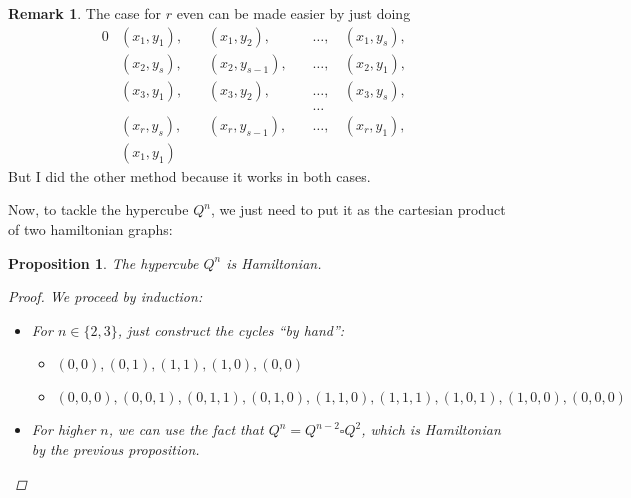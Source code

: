 \documentclass{amsart}
\theoremstyle{plain}
\newtheorem*{proposition}{\textbf{Proposition}}
\theoremstyle{definition}
\newtheorem*{rk}{\textbf{Remark}}
\begin{document}
    \begin{rk}
        The case for $r$ even can be made easier by just doing
        \begin{alignat*}{0}
            & (x_1, y_1),\, && (x_1, y_2),\, && \ldots, \, & (x_1, y_s), & \\
            & (x_2, y_s),\, && (x_2, y_{s-1}),\, && \ldots, \,  & (x_2, y_1), & \\
            & (x_3, y_1),\, && (x_3, y_2),\, && \ldots, \, & (x_3, y_s), & \\
            &&&&& \ldots \\
            & (x_r, y_s),\, && (x_r, y_{s-1}),\, && \ldots, \,  & (x_r, y_1), & \\
            & (x_1, y_1) &&&&&&
        \end{alignat*}
        But I did the other method because it works in both cases.
    \end{rk}
    \noindent Now, to tackle the hypercube $Q^n$, we just need to put it as the cartesian product of two hamiltonian graphs:
    \begin{proposition}
        The hypercube $Q^n$ is Hamiltonian.
        \begin{proof}
             We proceed by induction:
            \begin{itemize}
                \item For $n \in \{2, 3\}$, just construct the cycles ``by hand'':
                \begin{itemize}
                    \item $(0, 0), (0, 1), (1, 1), (1, 0), (0, 0)$
                    \item $(0, 0, 0), (0, 0, 1), (0, 1, 1), (0, 1, 0), (1, 1, 0), (1, 1, 1), (1, 0, 1), (1, 0, 0), (0, 0, 0)$
                \end{itemize}
                \item For higher $n$, we can use the fact that $Q^n = Q^{n-2} \square Q^2$, which is Hamiltonian by the previous proposition.
            \end{itemize}
        \end{proof}
    \end{proposition}
\end{document}
